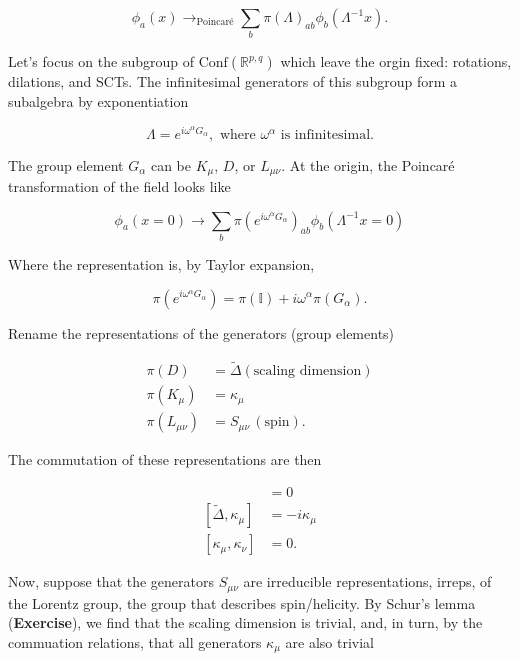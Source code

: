\begin{equation}
\phi_a (x) \rightarrow_{\text{Poincar\'e}} \sum_b \pi(\Lambda)_{ab} \phi_b (\Lambda^{-1}x).
\end{equation}

\noindent Let's focus on the subgroup of $\text{Conf}(\mathbb{R}^{p,q})$ which leave the orgin fixed: rotations, dilations, and SCTs. The infinitesimal generators of this subgroup form a subalgebra by exponentiation

\begin{equation}
\Lambda = e^{i \omega^\alpha G_\alpha}, \,\, \text{where } \omega^\alpha \text{ is infinitesimal.}
\end{equation}

\noindent The group element $G_\alpha$ can be $K_\mu$, $D$, or $L_{\mu\nu}$. At the origin, the Poincar\'e transformation  of the field looks like

\begin{equation}
\phi_a (x=0) \rightarrow \sum_b \pi (e^{i \omega^\alpha G_\alpha})_{ab} \phi_b (\Lambda^{-1} x = 0)
\end{equation}

\noindent Where the representation is, by Taylor expansion,

\begin{equation}
\pi(e^{i \omega^\alpha G_\alpha}) = \pi(\mathbb{I}) + i \omega^\alpha \pi(G_\alpha).
\end{equation}

\noindent Rename the representations of the generators (group elements)

\begin{align}
\pi(D) &= \tilde{\Delta} (\text{scaling dimension})\\
\pi(K_\mu) &= \kappa_\mu \\
\pi(L_{\mu\nu}) &= S_{\mu\nu} \, (\text{spin}).
\end{align}

\noindent The commutation of these representations are then

\begin{align}
[ \tilde{\Delta}, S_{\mu\nu} ] &= 0 \\
[ \tilde{\Delta}, \kappa_\mu ] &= -i \kappa_\mu \\
[ \kappa_\mu, \kappa_\nu ] &= 0.
\end{align}

\noindent Now, suppose that the generators $S_{\mu\nu}$ are irreducible representations, irreps, of the Lorentz group, the group that describes spin/helicity. By Schur's lemma (\textbf{Exercise}), we find that the scaling dimension is trivial, and, in turn, by the commuation relations, that all generators $\kappa_\mu$ are also trivial

